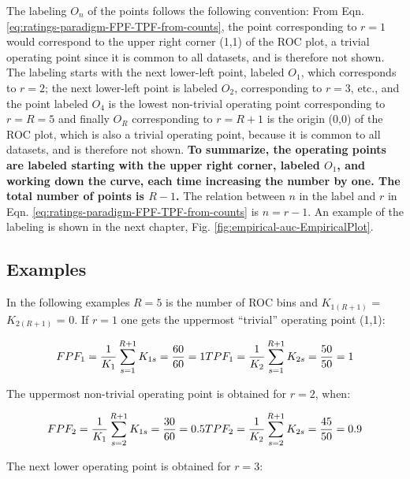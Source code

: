 \documentclass[
]{book}
\begin{document}
The labeling \(O_n\) of the points follows the following convention: From Eqn. \eqref{eq:ratings-paradigm-FPF-TPF-from-counts}, the point corresponding to \(r=1\) would correspond to the upper right corner (1,1) of the ROC plot, a trivial operating point since it is common to all datasets, and is therefore not shown. The labeling starts with the next lower-left point, labeled \(O_1\), which corresponds to \(r=2\); the next lower-left point is labeled \(O_2\), corresponding to \(r=3\), etc., and the point labeled \(O_4\) is the lowest non-trivial operating point corresponding to \(r=R=5\) and finally \(O_R\) corresponding to \(r=R+1\) is the origin (0,0) of the ROC plot, which is also a trivial operating point, because it is common to all datasets, and is therefore not shown. \textbf{To summarize, the operating points are labeled starting with the upper right corner, labeled \(O_1\), and working down the curve, each time increasing the number by one. The total number of points is \(R-1\).} The relation between \(n\) in the label and \(r\) in Eqn. \eqref{eq:ratings-paradigm-FPF-TPF-from-counts} is \(n=r-1\). An example of the labeling is shown in the next chapter, Fig. \ref{fig:empirical-auc-EmpiricalPlot}.

\hypertarget{binary-task-examples}{%
\subsection{Examples}\label{binary-task-examples}}

In the following examples \(R = 5\) is the number of ROC bins and \(K_{1(R+1)}\) = \(K_{2(R+1)}\) = 0. If \(r = 1\) one gets the uppermost ``trivial'' operating point (1,1):

\begin{equation*} 
FPF_1=\frac {1} {K_1} \sum_{s=1}^{R+1}K_{1s} = \frac{60}{60} = 1\\
TPF_1=\frac {1} {K_2} \sum_{s=1}^{R+1}K_{2s} = \frac{50}{50} = 1
\end{equation*}

The uppermost non-trivial operating point is obtained for \(r = 2\), when:

\begin{equation*} 
FPF_2=\frac {1} {K_1} \sum_{s=2}^{R+1}K_{1s} = \frac{30}{60} = 0.5\\
TPF_2=\frac {1} {K_2} \sum_{s=2}^{R+1}K_{2s} = \frac{45}{50} = 0.9
\end{equation*}

The next lower operating point is obtained for \(r = 3\):
\end{document}
